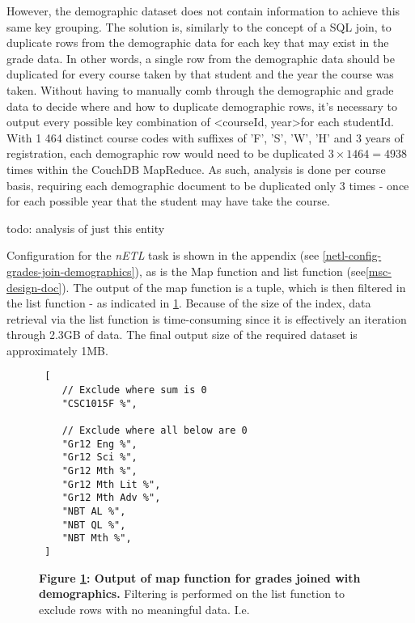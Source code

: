 However, the demographic dataset does not contain information to achieve this same key grouping. The solution is, similarly to the concept of a SQL join, to duplicate rows from the demographic data for each key that may exist in the grade data. In other words, a single row from the demographic data should be duplicated for every course taken by that student and the year the course was taken. Without having to manually comb through the demographic and grade data to decide where and how to duplicate demographic rows, it's necessary to output every possible key combination of \textless courseId, year\textgreater for each studentId. With 1 464 distinct course codes with suffixes of 'F', 'S', 'W', 'H' and 3 years of registration, each demographic row would need to be duplicated $ 3 \times 1464 = 4938 $ times within the CouchDB MapReduce. As such, analysis is done per course basis, requiring each demographic document to be duplicated only 3 times - once for each possible year that the student may have take the course.

todo: analysis of just this entity

Configuration for the \textit{nETL} task is shown in the appendix (see \ref{netl-config-grades-join-demographics}), as is the Map function and list function (see\ref{msc-design-doc}). The output of the map function is a tuple, which is then filtered in the list function - as indicated in \ref{grades-join-demographics-output}. Because of the size of the index, data retrieval via the list function is time-consuming since it is effectively an iteration through 2.3GB of data. The final output size of the required dataset is approximately 1MB.

\begin{figure}[ht]
    \centering
    \begin{verbatim}
 [
    // Exclude where sum is 0
    "CSC1015F %",

    // Exclude where all below are 0 
    "Gr12 Eng %", 
    "Gr12 Sci %",
    "Gr12 Mth %",
    "Gr12 Mth Lit %",
    "Gr12 Mth Adv %",
    "NBT AL %",
    "NBT QL %",
    "NBT Mth %",
 ]    
    \end{verbatim}
    \caption[Analysis 1: Grades joined with Demographics]{\textbf{Figure \ref{grades-join-demographics-output}: Output of map function for grades joined with demographics.} Filtering is performed on the list function to exclude rows with no meaningful data. I.e. }
    \label{grades-join-demographics-output}
\end{figure}



